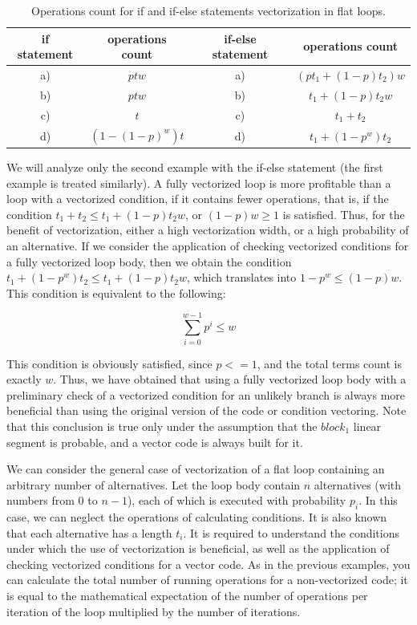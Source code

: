 \documentclass[
11pt,%
tightenlines,%
twoside,%
onecolumn,%
nofloats,%
nobibnotes,%
nofootinbib,%
superscriptaddress,%
noshowpacs,%
centertags]%
{revtex4}
\begin{document}
\begin{table}[!h]
\setcaptionmargin{0mm}
\onelinecaptionsfalse
{}
\caption{Operations count for if and if-else statements vectorization in flat loops.}
\bigskip
\begin{tabular}{|c|c|c|c|}
\hline
if statement & operations count & if-else statement & operations count \\
\hline
a) & $ptw$ & a) & $\left( pt_1 + (1 - p)t_2 \right)w$ \\
b) & $ptw$ & b) & $t_1 + (1 - p)t_2w$ \\
c) & $t$ & c) & $t_1 + t_2$ \\
d) & $\left( 1 - (1 - p)^w \right)t$ & d) & $t_1 + (1 - p^w)t_2$ \\
\hline
\end{tabular}
\label{tab:flat}
\end{table}

We will analyze only the second example with the if-else statement (the first example is treated similarly).
A fully vectorized loop is more profitable than a loop with a vectorized condition, if it contains fewer operations, that is, if the condition $t_1 + t_2 \le t_1 + (1 - p) t_2w$, or $(1 - p) w \ge 1$ is satisfied.
Thus, for the benefit of vectorization, either a high vectorization width, or a high probability of an alternative.
If we consider the application of checking vectorized conditions for a fully vectorized loop body, then we obtain the condition $t_1 + (1 - p ^ w) t_2 \le t_1 + (1 - p) t_2w$, which translates into $1 - p ^ w \le (1 - p) w$.
This condition is equivalent to the following:

\begin{equation}
\sum_{i = 0}^{w - 1}{p^i} \le w
\end{equation}

This condition is obviously satisfied, since $p <= 1$, and the total terms count is exactly $w$.
Thus, we have obtained that using a fully vectorized loop body with a preliminary check of a vectorized condition for an unlikely branch is always more beneficial than using the original version of the code or condition vectoring.
Note that this conclusion is true only under the assumption that the $block_1$ linear segment is probable, and a vector code is always built for it.

We can consider the general case of vectorization of a flat loop containing an arbitrary number of alternatives.
Let the loop body contain $n$ alternatives (with numbers from 0 to $n - 1$), each of which is executed with probability $p_i$.
In this case, we can neglect the operations of calculating conditions.
It is also known that each alternative has a length $t_i$.
It is required to understand the conditions under which the use of vectorization is beneficial, as well as the application of checking vectorized conditions for a vector code.
As in the previous examples, you can calculate the total number of running operations for a non-vectorized code; it is equal to the mathematical expectation of the number of operations per iteration of the loop multiplied by the number of iterations.
\end{document}
